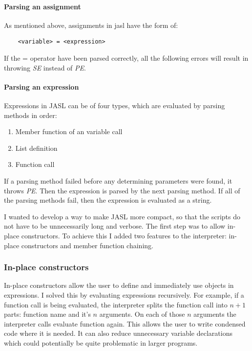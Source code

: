 \documentclass{ctuthesis}
\begin{document}
\paragraph{Parsing an assignment}
As mentioned above, assignments in jasl have the form of:
\begin{verbatim}
	<variable> = <expression>
\end{verbatim}

If the = operator have been parsed correctly, all the following errors will result in throwing \textit{SE} instead of \textit{PE}.  

\paragraph{Parsing an expression}
Expressions in JASL can be of four types, which are evaluated by parsing methods in order:
\begin{enumerate}
	\item Member function of an variable call
	\item List definition
	\item Function call
\end{enumerate}

If a parsing method failed before any determining parameters were found, it throws \textit{PE}. Then the expression is parsed by the next parsing method. If all of the parsing methods fail, then the expression is evaluated as a string. 

I wanted to develop a way to make JASL more compact, so that the scripts do not have to be unnecessarily long and verbose. The first step was to allow in-place constructors. To achieve this I added two features to the interpreter: in-place constructors and member function chaining.

\subsubsection{In-place constructors}
In-place constructors allow the user to define and immediately use objects in expressions. I solved this by evaluating expressions recursively. For example, if a function call is being evaluated, the interpreter splits the function call into $n+1$ parts: function name and it's $n$ arguments. On each of those $n$ arguments the interpreter calls evaluate function again. This allows the user to write condensed code where it is needed. It can also reduce unnecessary variable declarations which could potentially be quite problematic in larger programs.
\end{document}
